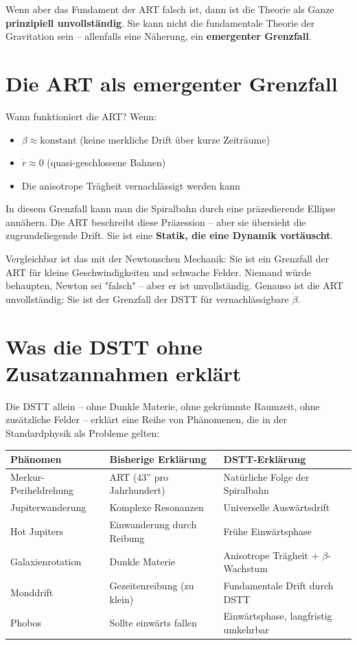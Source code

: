 \documentclass[12pt,a4paper]{article}
\begin{document}
Wenn aber das Fundament der ART falsch ist, dann ist die Theorie als Ganze \textbf{prinzipiell unvollständig}. Sie kann nicht die fundamentale Theorie der Gravitation sein – allenfalls eine Näherung, ein \textbf{emergenter Grenzfall}.

\section{Die ART als emergenter Grenzfall}

Wann funktioniert die ART? Wenn:

\begin{itemize}
    \item \(\beta \approx \text{konstant}\) (keine merkliche Drift über kurze Zeiträume)
    \item \(\dot{r} \approx 0\) (quasi-geschlossene Bahnen)
    \item Die anisotrope Trägheit vernachlässigt werden kann
\end{itemize}

In diesem Grenzfall kann man die Spiralbahn durch eine präzedierende Ellipse annähern. Die ART beschreibt diese Präzession – aber sie übersieht die zugrundeliegende Drift. Sie ist eine \textbf{Statik, die eine Dynamik vortäuscht}.

Vergleichbar ist das mit der Newtonschen Mechanik: Sie ist ein Grenzfall der ART für kleine Geschwindigkeiten und schwache Felder. Niemand würde behaupten, Newton sei "falsch" – aber er ist unvollständig. Genauso ist die ART unvollständig: Sie ist der Grenzfall der DSTT für vernachlässigbare \(\dot{\beta}\).

\section{Was die DSTT ohne Zusatzannahmen erklärt}

Die DSTT allein – ohne Dunkle Materie, ohne gekrümmte Raumzeit, ohne zusätzliche Felder – erklärt eine Reihe von Phänomenen, die in der Standardphysik als Probleme gelten:

\begin{tabular}{|l|l|l|}
\hline
\textbf{Phänomen} & \textbf{Bisherige Erklärung} & \textbf{DSTT-Erklärung} \\
\hline
Merkur-Periheldrehung & ART (43'' pro Jahrhundert) & Natürliche Folge der Spiralbahn \\
Jupiterwanderung & Komplexe Resonanzen & Universelle Auswärtsdrift \\
Hot Jupiters & Einwanderung durch Reibung & Frühe Einwärtsphase \\
Galaxienrotation & Dunkle Materie & Anisotrope Trägheit + \(\beta\)-Wachstum \\
Monddrift & Gezeitenreibung (zu klein) & Fundamentale Drift durch DSTT \\
Phobos & Sollte einwärts fallen & Einwärtsphase, langfristig umkehrbar \\
\hline
\end{tabular}
\end{document}
